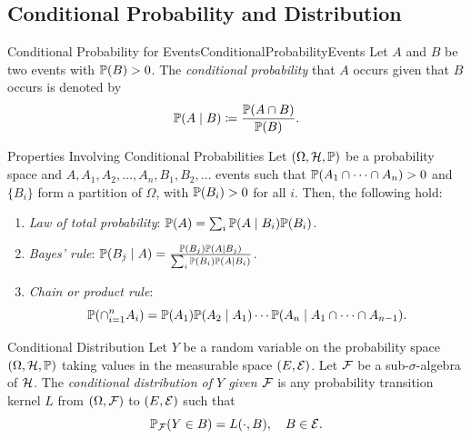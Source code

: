 \subsection{Conditional Probability and Distribution}

\begin{defn}{Conditional Probability for Events}{ConditionalProbabilityEvents}
Let $A$ and $B$ be two events with $\mathbb{P}(B) > 0$. The \textit{conditional probability} that $A$ occurs given that $B$ occurs is denoted by
\begin{equation}
    \mathbb{P}(A \mid B) \coloneqq \frac{\mathbb{P}(A \cap B)}{\mathbb{P}(B)}.
    \label{eq:ConditionalProbabilityDef}
\end{equation}
\end{defn}

\begin{thm}{Properties Involving Conditional Probabilities}{}
Let $(\Omega, \mathcal{H}, \mathbb{P})$ be a probability space and $A, A_1, A_2, \dots, A_n, B_1, B_2, \dots$ events such that $\mathbb{P}(A_1 \cap \dots \cap A_n) > 0$ and $\{B_i\}$ form a partition of $\Omega$, with $\mathbb{P}(B_i) > 0$ for all $i$. Then, the following hold:
\begin{enumerate}
    \item \textit{Law of total probability}: $\mathbb{P}(A) = \sum_i \mathbb{P}(A \mid B_i) \mathbb{P}(B_i)$.
    \item \textit{Bayes' rule}: $\mathbb{P}(B_j \mid A) = \frac{\mathbb{P}(B_j) \mathbb{P}(A \mid B_j)}{\sum_i \mathbb{P}(B_i) \mathbb{P}(A \mid B_i)}$.
    \item \textit{Chain or product rule}:
    \begin{equation*}
        \mathbb{P}(\cap_{i=1}^n A_i) = \mathbb{P}(A_1) \mathbb{P}(A_2 \mid A_1) \cdots \mathbb{P}(A_n \mid A_1 \cap \dots \cap A_{n-1}).
    \end{equation*}
\end{enumerate}
\end{thm}

\begin{defn}{Conditional Distribution}{}
Let $Y$ be a random variable on the probability space $(\Omega, \mathcal{H}, \mathbb{P})$ taking values in the measurable space $(E, \mathcal{E})$. Let $\mathcal{F}$ be a sub-$\sigma$-algebra of $\mathcal{H}$. The \textit{conditional distribution of $Y$ given $\mathcal{F}$} is any probability transition kernel $L$ from $(\Omega, \mathcal{F})$ to $(E, \mathcal{E})$ such that
\begin{equation}
    \mathbb{P}_{\mathcal{F}}(Y \in B) = L(\cdot, B), \quad B \in \mathcal{E}.
    \label{eq:ConditionalDistributionDef}
\end{equation}
\end{defn}

